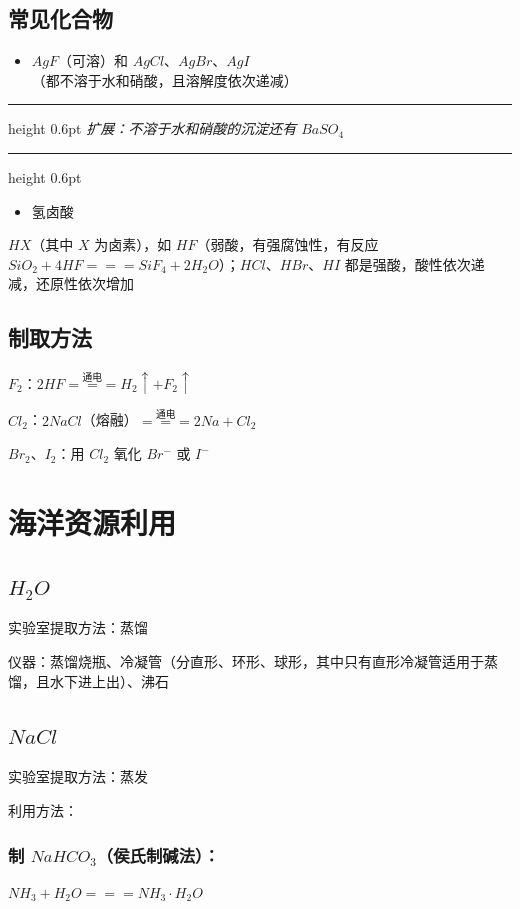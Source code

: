 \documentclass[UTF8,zihao=-4,openany]{ctexbook}
\newenvironment{notebox}
  {\par\smallskip\noindent\begingroup\begin{minipage}{\linewidth}\color{noteframe}\hrule height 0.6pt\smallskip\color{black}\itshape}
  {\par\smallskip\color{noteframe}\hrule height 0.6pt\end{minipage}\endgroup\par\smallskip}
\begin{document}
\subsection{常见化合物}
\begin{itemize}
\item $AgF$（可溶）和 $AgCl$、$AgBr$、$AgI$（都不溶于水和硝酸，且溶解度依次递减）
\end{itemize}
\begin{notebox}
扩展：不溶于水和硝酸的沉淀还有 $BaSO_4$\par
\end{notebox}
\begin{itemize}
\item 氢卤酸
\end{itemize}
$HX$（其中 $X$ 为卤素），如 $HF$（弱酸，有强腐蚀性，有反应 $SiO_2+4HF=\!=\!=SiF_4+2H_2O$）；$HCl$、$HBr$、$HI$ 都是强酸，酸性依次递减，还原性依次增加\par

\subsection{制取方法}
$F_2$：$2HF\stackrel{\mbox{通电}}{=\!=\!=}H_2\uparrow+F_2\uparrow$\par

$Cl_2$：$2NaCl$（熔融）$\stackrel{\mbox{通电}}{=\!=\!=}2Na+Cl_2$\par

$Br_2$、$I_2$：用 $Cl_2$ 氧化 $Br^-$ 或 $I^-$\par
\section{海洋资源利用}
\subsection{$H_2O$}
实验室提取方法：蒸馏\par

仪器：蒸馏烧瓶、冷凝管（分直形、环形、球形，其中只有直形冷凝管适用于蒸馏，且水下进上出）、沸石\par
\subsection{$NaCl$}
实验室提取方法：蒸发\par

利用方法：\par
\subsubsection{制 $NaHCO_3$（侯氏制碱法）：}
$NH_3+H_2O=\!=\!=NH_3\cdot H_2O$\par
\end{document}
